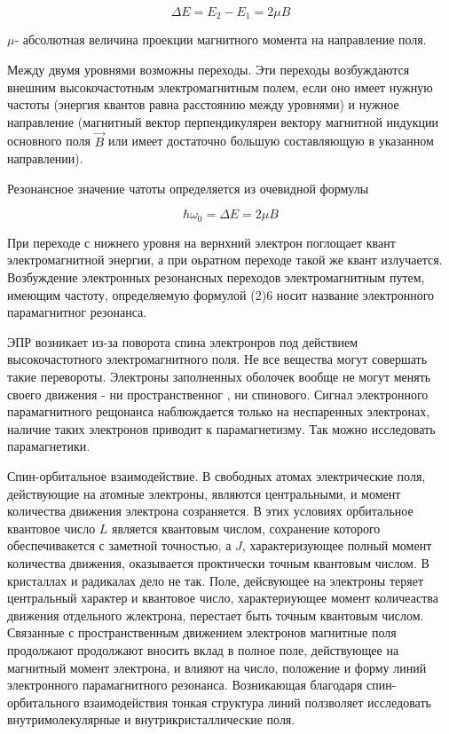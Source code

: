 \documentclass[a4paper]{article}
\begin{document}
\begin{equation}
    \Delta E = E_2 - E_1 = 2 \mu B
\end{equation}

$\mu$- абсолютная величина проекции магнитного момента на направление поля.\par 

Между двумя уровнями возможны переходы. Эти переходы возбуждаются внешним высокочастотным электромагнитным полем, 
если оно имеет нужную частоты (энергия квантов равна расстоянию между уровнями) и нужное направление (магнитный вектор 
перпендикулярен вектору магнитной индукции основного поля $\vec{B}$ или имеет достаточно большую составляющую в указанном 
направлении). \par 

Резонансное значение чатоты определяется из очевидной формулы 

\begin{equation}
    \hbar \omega_0 = \Delta E = 2 \mu B
\end{equation}

При переходе с нижнего уровня на вернхний электрон поглощает квант электромагнитной энергии, 
а при оьратном переходе такой же квант излучается. Возбуждение электронных резонансных переходов электромагнитным путем, 
имеющим частоту, определяемую формулой (2)6 носит название электронного парамагнитног резонанса. \par 

ЭПР возникает из-за поворота спина электронров под действием высокочастотного электромагнитного поля. Не все 
вещества могут совершать такие перевороты. Электроны заполненных оболочек вообще не могут менять своего движения - ни пространственног , ни спинового. 
Сигнал электронного парамагнитного рещонанса наблюждается только на неспаренных электронах, наличие таких электронов приводит 
к парамагнетизму. Так можно исследовать парамагнетики. \par 

Спин-орбитальное взаимодействие. В свободных атомах электрические поля, действующие на атомные электроны, являются центральными, и момент 
количества движения электрона созраняется. В этих условиях орбитальное квантовое число $L$ является 
квантовым числом, сохранение которого обеспечивакется с заметной точностью, а $J$, характеризующее полный момент количества движения, оказывается проктически точным 
квантовым числом. В кристаллах и радикалах дело не так. Поле, дейсвующее на электроны теряет центральный характер и квантовое число, характериующее момент 
количеаства движения отдельного жлектрона, перестает быть точным квантовым числом. Связанные с пространственным движением электронов магнитные поля продолжают 
продолжают вносить вклад в полное поле, действующее на магнитный момент электрона, и влияют на число, положение и форму линий электронного парамагнитного резонанса. 
Возникающая благодаря спин-орбитального взаимодействия тонкая структура линий ползволяет исследовать внутримолекулярные и внутрикристаллические поля. \par 
\end{document}
